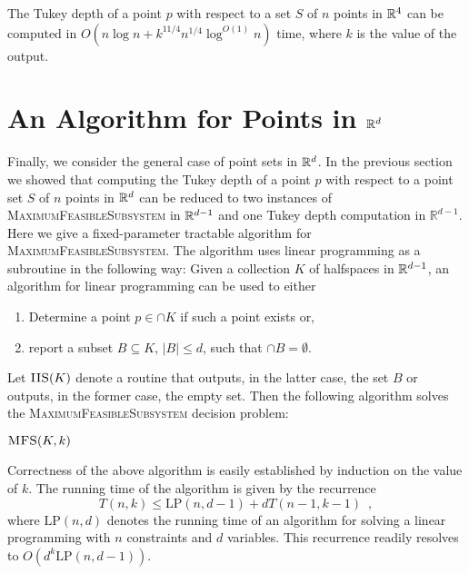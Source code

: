 \documentclass[charterfonts,lotsofwhite]{patmorin}
\newcommand{\lp}{\mathrm{LP}}
\begin{document}
\begin{thm}
The Tukey depth of a point $p$ with respect to a set $S$ of $n$ points
in $\mathbb{R}^4$ can be computed in $O(n\log n + k^{11/4}n^{1/4}\log^{O(1)}
n)$ time, where $k$ is the value of the output.
\end{thm}

\section{An Algorithm for Points in $\mathbb{R}^d$}

Finally, we consider the general case of point sets in $\mathbb{R}^d$.  
In the previous section we showed that computing the Tukey depth of
a point $p$ with respect to a point set $S$ of $n$ points in $\mathbb{R}^d$
can be reduced to two instances of \textsc{MaximumFeasibleSubsystem}
in $\mathbb{R}^{d-1}$ and one Tukey depth computation in $\mathbb{R}^{d-1}$.  Here we give a fixed-parameter tractable \cite{df98}
algorithm for \textsc{MaximumFeasibleSubsystem}.  The algorithm uses
linear programming as a subroutine in the following way:  Given a
collection $K$ of halfspaces in $\mathbb{R}^{d-1}$, an algorithm for linear
programming can be used to either
\begin{enumerate}
\item Determine a point $p\in\cap K$ if such a point exists or,
\item report a subset $B\subseteq K$, $|B|\le d$, such that $\cap B=\emptyset$.
\end{enumerate}
Let $\textsc{IIS}(K)$ denote a routine that outputs, in the latter
case, the set
$B$ or outputs, in the former case, the empty set.
Then the following algorithm solves the
\textsc{MaximumFeasibleSubsystem} decision problem:

\noindent$\textsc{MFS}(K,k)$
\begin{algorithmic}[1]
\ENDIF
{}
\ENDIF
{}
   \ENDIF
\ENDFOR
{}
\end{algorithmic}

Correctness of the above algorithm is easily established by induction
on the value of $k$.  The running time of the algorithm is given by
the recurrence
\[
    T(n,k) \le \lp(n,d-1)+ dT(n-1,k-1) \enspace ,
\]
where $\lp(n,d)$ denotes the running time of an algorithm for solving
a linear programming with $n$ constraints and $d$ variables.  This
recurrence readily resolves to $O(d^k\lp(n,d-1))$.  
\end{document}
